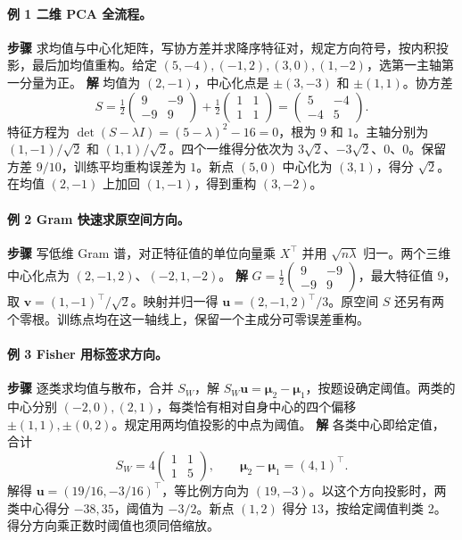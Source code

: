 \documentclass[UTF8,a4paper,zihao=-4,fontset=fandol]{ctexrep}
\begin{document}
\paragraph{例 1 二维 PCA 全流程。}
\textbf{步骤} 求均值与中心化矩阵，写协方差并求降序特征对，规定方向符号，按内积投影，最后加均值重构。给定 \((5,-4),(-1,2),(3,0),(1,-2)\)，选第一主轴第一分量为正。
\textbf{解} 均值为 \((2,-1)\)，中心化点是 \(\pm(3,-3)\) 和 \(\pm(1,1)\)。协方差
\[
 S=\tfrac12\begin{pmatrix}9&-9\\-9&9\end{pmatrix}
   +\tfrac12\begin{pmatrix}1&1\\1&1\end{pmatrix}
  =\begin{pmatrix}5&-4\\-4&5\end{pmatrix}.
\]
特征方程为 \(\det(S-\lambda I)=(5-\lambda)^2-16=0\)，根为 \(9\) 和 \(1\)。主轴分别为 \((1,-1)/\sqrt2\) 和 \((1,1)/\sqrt2\)。四个一维得分依次为 \(3\sqrt2\)、\(-3\sqrt2\)、\(0\)、\(0\)。保留方差 \(9/10\)，训练平均重构误差为 \(1\)。新点 \((5,0)\) 中心化为 \((3,1)\)，得分 \(\sqrt2\)。在均值 \((2,-1)\) 上加回 \((1,-1)\)，得到重构 \((3,-2)\)。

\paragraph{例 2 Gram 快速求原空间方向。}
\textbf{步骤} 写低维 Gram 谱，对正特征值的单位向量乘 \(X^\top\) 并用 \(\sqrt{n\lambda}\) 归一。两个三维中心化点为 \((2,-1,2)\)、\((-2,1,-2)\)。
\textbf{解} \(G=\frac12\begin{pmatrix}9&-9\\-9&9\end{pmatrix}\)，最大特征值 \(9\)，取 \(\bm v=(1,-1)^\top/\sqrt2\)。映射并归一得 \(\bm u=(2,-1,2)^\top/3\)。原空间 \(S\) 还另有两个零根。训练点均在这一轴线上，保留一个主成分可零误差重构。

\paragraph{例 3 Fisher 用标签求方向。}
\textbf{步骤} 逐类求均值与散布，合并 \(S_W\)，解 \(S_W\bm u=\bm\mu_2-\bm\mu_1\)，按题设确定阈值。两类的中心分别 \((-2,0),(2,1)\)，每类恰有相对自身中心的四个偏移 \(\pm(1,1),\pm(0,2)\)。规定用两均值投影的中点为阈值。
\textbf{解} 各类中心即给定值，合计
\[
 S_W=4\begin{pmatrix}1&1\\1&5\end{pmatrix},\qquad
 \bm\mu_2-\bm\mu_1=(4,1)^\top.
\]
解得 \(\bm u=(19/16,-3/16)^\top\)，等比例方向为 \((19,-3)\)。以这个方向投影时，两类中心得分 \(-38,35\)，阈值为 \(-3/2\)。新点 \((1,2)\) 得分 \(13\)，按给定阈值判类 2。得分方向乘正数时阈值也须同倍缩放。
\end{document}
